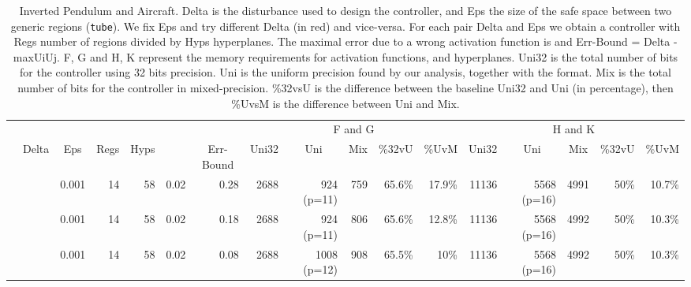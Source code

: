 \begin{landscape}
	\pagestyle{empty}
\begin{table}[p]
	\centering
	\caption{Inverted Pendulum and Aircraft.\textmd{ Delta is the disturbance used to design the controller, and Eps the size of the safe space between two generic regions (\texttt{tube}). We fix Eps and try different Delta (in red) and vice-versa. For each pair Delta and Eps we obtain a controller with Regs number of regions divided by Hyps hyperplanes. The maximal error due to a wrong activation function is \maxUij and Err-Bound = Delta - maxUiUj. F, G and H, K represent the memory requirements for activation functions, and hyperplanes. Uni32 is the total number of bits for the controller using 32 bits precision. Uni is the uniform precision found by our analysis, together with the format. Mix is the total number of bits for the controller in mixed-precision. \%32vsU is the difference between the baseline Uni32 and Uni (in percentage), then \%UvsM is the difference between Uni and Mix.}}
	\label{tab:ipd}
	\begin{tabular}{|l|rrrrrrrrrrrrrrrr|}
		\cline{8-12}
		\cline{12-17}
		\multicolumn{1}{c}{} & %
		\multicolumn{4}{c}{} &
		\multicolumn{2}{c}{} &
		\multicolumn{5}{|c|}{F and G} &
		\multicolumn{5}{c|}{H and K} \\
		\cline{2-17}
		\multicolumn{1}{c}{\multirow{14}{*}{\rotatebox{90}{pendulum}}} &
		\multicolumn{1}{|c}{Delta}&
		\multicolumn{1}{c}{Eps} &
		\multicolumn{1}{c}{Regs} &
		\multicolumn{1}{c}{Hyps} &
		\multicolumn{1}{c}{\maxUij} &
		\multicolumn{1}{c}{Err-Bound} &
		\multicolumn{1}{c}{Uni32}&
		\multicolumn{1}{c}{Uni}&
		\multicolumn{1}{c}{Mix}&
		\multicolumn{1}{c}{\%32vU}&
		\multicolumn{1}{c}{\%UvM}&
		\multicolumn{1}{c}{Uni32}&
		\multicolumn{1}{c}{Uni}&
		\multicolumn{1}{c}{Mix}&
		\multicolumn{1}{c}{\%32vU}&
		\multicolumn{1}{c|}{\%UvM} \\
		\cline{1-17}
		& \color{red}{0.30} & 0.001 & 14 & 58 & 0.02 & 0.28 & 2688 & 924 (p=11) & 759 & 65.6\% & 17.9\% & 11136 & 5568 (p=16) & 4991 & 50\% & 10.7\% \\
		
		& \color{red}{0.20} & 0.001 & 14 & 58 & 0.02 & 0.18 & 2688 & 924 (p=11) & 806 & 65.6\% & 12.8\% & 11136 & 5568 (p=16)& 4992 & 50\% & 10.3\% \\
		
		& \color{red}{0.10} & 0.001 & 14 & 58 & 0.02 & 0.08 & 2688 & 1008 (p=12) & 908 & 65.5\% & 10\% & 11136 & 5568 (p=16)& 4992 & 50\% & 10.3\% \\
		

\end{tabular}
\end{table}
\end{landscape}
